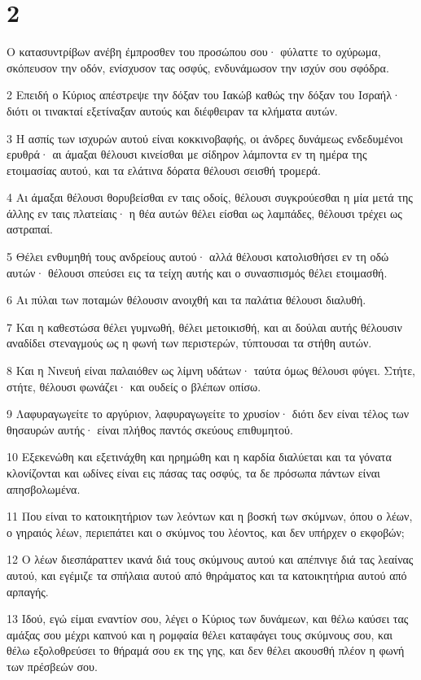 \chapter{2}

\par Ο κατασυντρίβων ανέβη έμπροσθεν του προσώπου σου· φύλαττε το οχύρωμα, σκόπευσον την οδόν, ενίσχυσον τας οσφύς, ενδυνάμωσον την ισχύν σου σφόδρα.
\par 2 Επειδή ο Κύριος απέστρεψε την δόξαν του Ιακώβ καθώς την δόξαν του Ισραήλ· διότι οι τινακταί εξετίναξαν αυτούς και διέφθειραν τα κλήματα αυτών.
\par 3 Η ασπίς των ισχυρών αυτού είναι κοκκινοβαφής, οι άνδρες δυνάμεως ενδεδυμένοι ερυθρά· αι άμαξαι θέλουσι κινείσθαι με σίδηρον λάμποντα εν τη ημέρα της ετοιμασίας αυτού, και τα ελάτινα δόρατα θέλουσι σεισθή τρομερά.
\par 4 Αι άμαξαι θέλουσι θορυβείσθαι εν ταις οδοίς, θέλουσι συγκρούεσθαι η μία μετά της άλλης εν ταις πλατείαις· η θέα αυτών θέλει είσθαι ως λαμπάδες, θέλουσι τρέχει ως αστραπαί.
\par 5 Θέλει ενθυμηθή τους ανδρείους αυτού· αλλά θέλουσι κατολισθήσει εν τη οδώ αυτών· θέλουσι σπεύσει εις τα τείχη αυτής και ο συνασπισμός θέλει ετοιμασθή.
\par 6 Αι πύλαι των ποταμών θέλουσιν ανοιχθή και τα παλάτια θέλουσι διαλυθή.
\par 7 Και η καθεστώσα θέλει γυμνωθή, θέλει μετοικισθή, και αι δούλαι αυτής θέλουσιν αναδίδει στεναγμούς ως η φωνή των περιστερών, τύπτουσαι τα στήθη αυτών.
\par 8 Και η Νινευή είναι παλαιόθεν ως λίμνη υδάτων· ταύτα όμως θέλουσι φύγει. Στήτε, στήτε, θέλουσι φωνάζει· και ουδείς ο βλέπων οπίσω.
\par 9 Λαφυραγωγείτε το αργύριον, λαφυραγωγείτε το χρυσίον· διότι δεν είναι τέλος των θησαυρών αυτής· είναι πλήθος παντός σκεύους επιθυμητού.
\par 10 Εξεκενώθη και εξετινάχθη και ηρημώθη και η καρδία διαλύεται και τα γόνατα κλονίζονται και ωδίνες είναι εις πάσας τας οσφύς, τα δε πρόσωπα πάντων είναι απησβολωμένα.
\par 11 Που είναι το κατοικητήριον των λεόντων και η βοσκή των σκύμνων, όπου ο λέων, ο γηραιός λέων, περιεπάτει και ο σκύμνος του λέοντος, και δεν υπήρχεν ο εκφοβών;
\par 12 Ο λέων διεσπάραττεν ικανά διά τους σκύμνους αυτού και απέπνιγε διά τας λεαίνας αυτού, και εγέμιζε τα σπήλαια αυτού από θηράματος και τα κατοικητήρια αυτού από αρπαγής.
\par 13 Ιδού, εγώ είμαι εναντίον σου, λέγει ο Κύριος των δυνάμεων, και θέλω καύσει τας αμάξας σου μέχρι καπνού και η ρομφαία θέλει καταφάγει τους σκύμνους σου, και θέλω εξολοθρεύσει το θήραμά σου εκ της γης, και δεν θέλει ακουσθή πλέον η φωνή των πρέσβεών σου.

